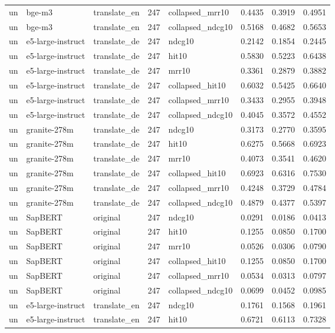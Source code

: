 \begin{tabular}{lllrlrrr}
un & bge-m3 & translate\_en & 247 & collapsed\_mrr10 & 0.4435 & 0.3919 & 0.4951 \\
un & bge-m3 & translate\_en & 247 & collapsed\_ndcg10 & 0.5168 & 0.4682 & 0.5653 \\
un & e5-large-instruct & translate\_de & 247 & ndcg10 & 0.2142 & 0.1854 & 0.2445 \\
un & e5-large-instruct & translate\_de & 247 & hit10 & 0.5830 & 0.5223 & 0.6438 \\
un & e5-large-instruct & translate\_de & 247 & mrr10 & 0.3361 & 0.2879 & 0.3882 \\
un & e5-large-instruct & translate\_de & 247 & collapsed\_hit10 & 0.6032 & 0.5425 & 0.6640 \\
un & e5-large-instruct & translate\_de & 247 & collapsed\_mrr10 & 0.3433 & 0.2955 & 0.3948 \\
un & e5-large-instruct & translate\_de & 247 & collapsed\_ndcg10 & 0.4045 & 0.3572 & 0.4552 \\
un & granite-278m & translate\_de & 247 & ndcg10 & 0.3173 & 0.2770 & 0.3595 \\
un & granite-278m & translate\_de & 247 & hit10 & 0.6275 & 0.5668 & 0.6923 \\
un & granite-278m & translate\_de & 247 & mrr10 & 0.4073 & 0.3541 & 0.4620 \\
un & granite-278m & translate\_de & 247 & collapsed\_hit10 & 0.6923 & 0.6316 & 0.7530 \\
un & granite-278m & translate\_de & 247 & collapsed\_mrr10 & 0.4248 & 0.3729 & 0.4784 \\
un & granite-278m & translate\_de & 247 & collapsed\_ndcg10 & 0.4879 & 0.4377 & 0.5397 \\
un & SapBERT & original & 247 & ndcg10 & 0.0291 & 0.0186 & 0.0413 \\
un & SapBERT & original & 247 & hit10 & 0.1255 & 0.0850 & 0.1700 \\
un & SapBERT & original & 247 & mrr10 & 0.0526 & 0.0306 & 0.0790 \\
un & SapBERT & original & 247 & collapsed\_hit10 & 0.1255 & 0.0850 & 0.1700 \\
un & SapBERT & original & 247 & collapsed\_mrr10 & 0.0534 & 0.0313 & 0.0797 \\
un & SapBERT & original & 247 & collapsed\_ndcg10 & 0.0699 & 0.0452 & 0.0985 \\
un & e5-large-instruct & translate\_en & 247 & ndcg10 & 0.1761 & 0.1568 & 0.1961 \\
un & e5-large-instruct & translate\_en & 247 & hit10 & 0.6721 & 0.6113 & 0.7328 \\

\end{tabular}
